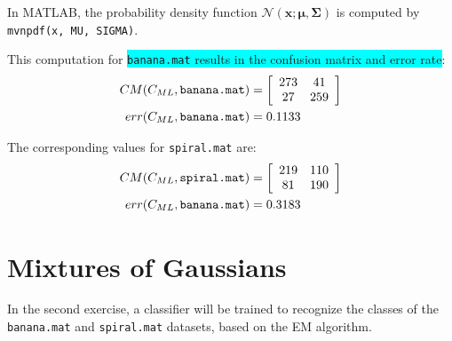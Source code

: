 \documentclass[a4paper,11pt]{article}
\newcommand{\V}[1]{\ensuremath{\mathbf{#1}}}
\newcommand{\cML}{\ensuremath{C_{ML}}}
\newcommand{\mean}{\ensuremath{\boldsymbol{\mu}}}
\newcommand{\cov}{\ensuremath{\boldsymbol{\Sigma}}}
\newcommand{\hl}[1]{\colorbox{cyan}{#1}}
\begin{document}
In MATLAB, the probability density function $\mathcal{N}(\V{x} ; \mean, \cov)$ is computed by \texttt{mvnpdf(x, MU, SIGMA)}.

This computation for \hl{\texttt{banana.mat} results in the confusion matrix and error rate}:
\begin{align*}
CM(\cML, \mbox{\texttt{banana.mat}}) 
    &= \left[ \begin{array}{cc}
      273 & 41 \\
      27 & 259\end{array}\right] \\
err(\cML, \mbox{\texttt{banana.mat}})
    &= 0.1133
\end{align*}

The corresponding values for \texttt{spiral.mat} are:
\begin{align*}
CM(\cML, \mbox{\texttt{spiral.mat}})
    &= \left[ \begin{array}{cc}
      219 & 110 \\
      81 & 190
\end{array}\right] \\
err(\cML, \mbox{\texttt{banana.mat}})
    &= 0.3183
\end{align*}


\section{Mixtures of Gaussians}
In the second exercise, a classifier will be trained to recognize the classes of the \texttt{banana.mat} and \texttt{spiral.mat} datasets, based on the EM algorithm.

\end{document}
